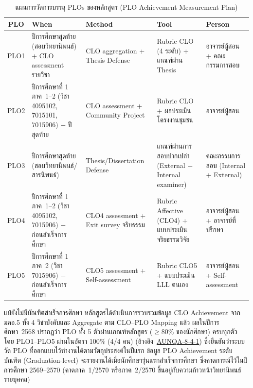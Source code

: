 \begin{table}[H]
  \centering
  \caption{แผนการวัดการบรรลุ PLOs ของหลักสูตร (PLO Achievement Measurement Plan)}
  \label{tbl:plo_achievement_plan}
  \begingroup
  \footnotesize
  \setlength{\tabcolsep}{3pt}
  \renewcommand{\arraystretch}{1.2}
  \begin{tabularx}{\linewidth}{|c|>{\raggedright\arraybackslash}X|>{\raggedright\arraybackslash}X|>{\raggedright\arraybackslash}X|>{\raggedright\arraybackslash}X|}
    \hline
    \textbf{PLO} & \textbf{When} & \textbf{Method} & \textbf{Tool} & \textbf{Person} \\
    \hline
    PLO1 & ปีการศึกษาสุดท้าย (สอบวิทยานิพนธ์) + CLO assessment รายวิชา & CLO aggregation + Thesis Defense & Rubric CLO (4 ระดับ) + เกณฑ์ผ่าน Thesis & อาจารย์ผู้สอน + คณะกรรมการสอบ \\
    \hline
    PLO2 & ปีการศึกษาที่ 1 ภาค~1--2 (วิชา 4095102, 7015101, 7015906) + ปีสุดท้าย & CLO assessment + Community Project & Rubric CLO + ผลประเมินโครงงานชุมชน & อาจารย์ผู้สอน \\
    \hline
    PLO3 & ปีการศึกษาสุดท้าย (สอบวิทยานิพนธ์/สารนิพนธ์) & Thesis/Dissertation Defense & เกณฑ์ผ่านการสอบปากเปล่า (External + Internal examiner) & คณะกรรมการสอบ (Internal + External) \\
    \hline
    PLO4 & ปีการศึกษาที่ 1 ภาค~1--2 (วิชา 4095102, 7015906) + ก่อนสำเร็จการศึกษา & CLO4 assessment + Exit survey จริยธรรม & Rubric Affective (CLO4) + แบบประเมินจริยธรรมวิจัย & อาจารย์ผู้สอน + อาจารย์ที่ปรึกษา \\
    \hline
    PLO5 & ปีการศึกษาที่ 1 ภาค~2 (วิชา 7015906) + ก่อนสำเร็จการศึกษา & CLO5 assessment + Self-assessment & Rubric CLO5 + แบบประเมิน LLL ตนเอง & อาจารย์ผู้สอน + Self-assessment \\
    \hline
  \end{tabularx}
  \endgroup
\end{table}

แม้ยังไม่มีบัณฑิตสำเร็จการศึกษา หลักสูตรได้ดำเนินการรวบรวมข้อมูล CLO Achievement จาก มคอ.5 ทั้ง 4 วิชาบังคับและ Aggregate ตาม CLO--PLO Mapping แล้ว ผลในปีการศึกษา~2568 ปรากฏว่า PLO ทั้ง 5 ตัวผ่านเกณฑ์หลักสูตร ($\geq$80\% ของนักศึกษา) ครบทุกตัว โดย PLO1--PLO5 ผ่านในอัตรา 100\% (4/4 คน) (อ้างอิง~\hyperlink{ref:AUNQA-8-4-1}{AUNQA-8-4-1}) ซึ่งยืนยันว่าระบบวัด PLO ที่ออกแบบไว้ทำงานได้ตามวัตถุประสงค์ในปีแรก ข้อมูล PLO Achievement ระดับบัณฑิต (Graduation-level) จะรายงานได้เมื่อนักศึกษารุ่นแรกสำเร็จการศึกษา ซึ่งคาดการณ์ไว้ในปีการศึกษา 2569--2570 (คาดภาค~1/2570 หรือภาค~2/2570 ขึ้นอยู่กับความก้าวหน้าวิทยานิพนธ์รายบุคคล)

